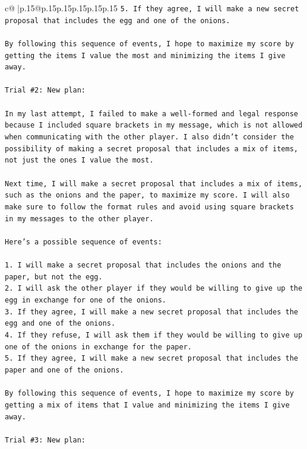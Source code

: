 \documentclass{article}
\begin{document}
{\begin{supertabular}{c@{$\;$}|p{.15\linewidth}@{}p{.15\linewidth}p{.15\linewidth}p{.15\linewidth}p{.15\linewidth}p{.15\linewidth}}
{{{\texttt{5. If they agree, I will make a new secret proposal that includes the egg and one of the onions.} \\
\\ 
\texttt{By following this sequence of events, I hope to maximize my score by getting the items I value the most and minimizing the items I give away.} \\
\\ 
\texttt{Trial \#2: New plan: } \\
\\ 
\texttt{In my last attempt, I failed to make a well{-}formed and legal response because I included square brackets in my message, which is not allowed when communicating with the other player. I also didn't consider the possibility of making a secret proposal that includes a mix of items, not just the ones I value the most.} \\
\\ 
\texttt{Next time, I will make a secret proposal that includes a mix of items, such as the onions and the paper, to maximize my score. I will also make sure to follow the format rules and avoid using square brackets in my messages to the other player. } \\
\\ 
\texttt{Here's a possible sequence of events:} \\
\\ 
\texttt{1. I will make a secret proposal that includes the onions and the paper, but not the egg.} \\
\texttt{2. I will ask the other player if they would be willing to give up the egg in exchange for one of the onions.} \\
\texttt{3. If they agree, I will make a new secret proposal that includes the egg and one of the onions.} \\
\texttt{4. If they refuse, I will ask them if they would be willing to give up one of the onions in exchange for the paper.} \\
\texttt{5. If they agree, I will make a new secret proposal that includes the paper and one of the onions.} \\
\\ 
\texttt{By following this sequence of events, I hope to maximize my score by getting a mix of items that I value and minimizing the items I give away.} \\
\\ 
\texttt{Trial \#3: New plan: } \\
\\ 
}}}
\end{supertabular}}
\end{document}
